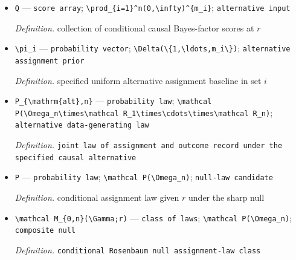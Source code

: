 \documentclass{article}
\begin{document}
\begin{itemize}
  \item \texttt{Q} --- \texttt{score array}; \texttt{\textbackslash{}\allowbreak{}prod\_\allowbreak{}\{i=\allowbreak{}1\}\allowbreak{}\textasciicircum{}n(0,\allowbreak{}\textbackslash{}\allowbreak{}infty)\textasciicircum{}\{m\_\allowbreak{}i\}\allowbreak{}}; \texttt{alternative input}
  \par\smallskip\noindent\emph{Definition.} collection of conditional causal Bayes-factor scores at \(r\)
  \item \texttt{\textbackslash{}\allowbreak{}pi\_\allowbreak{}i} --- \texttt{probability vector}; \texttt{\textbackslash{}\allowbreak{}Delta(\textbackslash{}\allowbreak{}\{1,\allowbreak{}\textbackslash{}\allowbreak{}ldots,\allowbreak{}m\_\allowbreak{}i\textbackslash{}\allowbreak{}\}\allowbreak{})}; \texttt{alternative assignment prior}
  \par\smallskip\noindent\emph{Definition.} specified uniform alternative assignment baseline in set \(i\)
  \item \texttt{P\_\allowbreak{}\{\textbackslash{}\allowbreak{}mathrm\{alt\}\allowbreak{},\allowbreak{}n\}\allowbreak{}} --- \texttt{probability law}; \texttt{\textbackslash{}\allowbreak{}mathcal P(\textbackslash{}\allowbreak{}Omega\_\allowbreak{}n\textbackslash{}\allowbreak{}times\textbackslash{}\allowbreak{}mathcal R\_\allowbreak{}1\textbackslash{}\allowbreak{}times\textbackslash{}\allowbreak{}cdots\textbackslash{}\allowbreak{}times\textbackslash{}\allowbreak{}mathcal R\_\allowbreak{}n)}; \texttt{alternative data-\allowbreak{}generating law}
  \par\smallskip\noindent\emph{Definition.} \texttt{joint law of assignment and outcome record under the specified causal alternative}
  \item \texttt{P} --- \texttt{probability law}; \texttt{\textbackslash{}\allowbreak{}mathcal P(\textbackslash{}\allowbreak{}Omega\_\allowbreak{}n)}; \texttt{null-\allowbreak{}law candidate}
  \par\smallskip\noindent\emph{Definition.} conditional assignment law given \(r\) under the sharp null
  \item \texttt{\textbackslash{}\allowbreak{}mathcal M\_\allowbreak{}\{0,\allowbreak{}n\}\allowbreak{}(\textbackslash{}\allowbreak{}Gamma;\allowbreak{}r)} --- \texttt{class of laws}; \texttt{\textbackslash{}\allowbreak{}mathcal P(\textbackslash{}\allowbreak{}Omega\_\allowbreak{}n)}; \texttt{composite null}
  \par\smallskip\noindent\emph{Definition.} \texttt{conditional Rosenbaum null assignment-\allowbreak{}law class}

\end{itemize}
\end{document}
